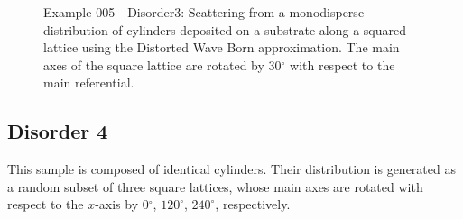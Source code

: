 \begin{figure}[H]
\hfill
{}
\hfill
{}
\hfill
\caption{Example 005 - Disorder3: Scattering from a monodisperse distribution of cylinders deposited on a substrate along a squared lattice using the Distorted Wave Born approximation. The main axes of the square lattice are rotated by 30$^{\circ}$ with respect to the main referential.}
\label{fig:PythonEx5Dis3}
\end{figure}


\subsection{Disorder 4}
This sample is composed of identical cylinders. Their distribution is generated as a random subset of three square lattices, whose main axes are rotated with respect to the $x$-axis by  0$^{\circ}$, $120^{\circ}$, $240^{\circ}$, respectively.

